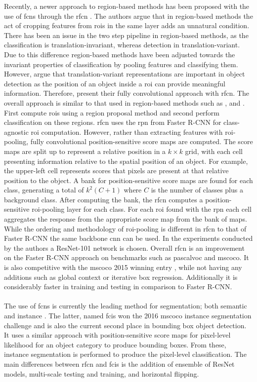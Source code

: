 Recently, a newer approach to region-based methods has been proposed with the use of \glspl{fcn} through the \gls{rfcn} \cite{rfcn}. The authors argue that in region-based methods the act of cropping features from \glspl{roi} in the same layer adds an unnatural condition. There has been an issue in the two step pipeline in region-based methods, as the classification is translation-invariant, whereas detection in translation-variant. Due to this difference region-based methods have been adjusted towards the invariant properties of classification by pooling features and classifying them. However, \cite{rfcn} argue that translation-variant representations are important in object detection as the position of an object inside a \gls{roi} can provide meaningful information. Therefore, \cite{rfcn} present their fully convolutional approach with \gls{rfcn}. The overall approach is similar to that used in region-based methods such as \cite{rcnn}, \cite{fastrcnn} and \cite{fasterrcnn}. First compute \glspl{roi} using a region proposal method and second perform classification on these regions. \gls{rfcn} uses the \gls{rpn} from Faster R-CNN \cite{fasterrcnn} for class-agnostic \gls{roi} computation. However, rather than extracting features with \gls{roi}-pooling, fully convolutional position-sensitive score maps are computed. The score maps are split up to represent a relative position in a $k\times k$ grid, with each cell presenting information relative to the spatial position of an object. For example, the upper-left cell represents scores that pixels are present at that relative position to the object. A bank for position-sensitive score maps are found for each class, generating a total of $k^2(C+1)$ where $C$ is the number of classes plus a background class. After computing the bank, the \gls{rfcn} computes a position-sensitive \gls{roi}-pooling layer for each class. For each \gls{roi} found with the \gls{rpn} each cell aggregates the response from the appropriate score map from the bank of maps. While the ordering and methodology of \gls{roi}-pooling is different in \gls{rfcn} to that of Faster R-CNN the same backbone \gls{cnn} can be used. In the experiments conducted by the authors a ResNet-101 network is chosen. Overall \gls{rfcn} is an improvement on the Faster R-CNN approach on benchmarks such as \gls{pascalvoc} and \gls{mscoco}. It is also competitive with the \gls{mscoco} 2015 winning entry \cite{deepres}, while not having any additions such as global context or iterative box regression. Additionally it is considerably faster in training and testing in comparison to Faster R-CNN. 
\\\\
The use of \glspl{fcn} is currently the leading method for segmentation; both semantic \cite{semfcn} and instance \cite{instancefcn}. The latter, named \gls{fcis} won the 2016 \gls{mscoco} instance segmentation challenge and is also the current second place in bounding box object detection. It uses a similar approach with position-sensitive score maps for pixel-level likelihood for an object category to produce bounding boxes. From these, instance segmentation is performed to produce the pixel-level classification. The main differences between \gls{rfcn} and \gls{fcis} is the addition of ensemble of ResNet models, multi-scale testing and training, and horizontal flipping.